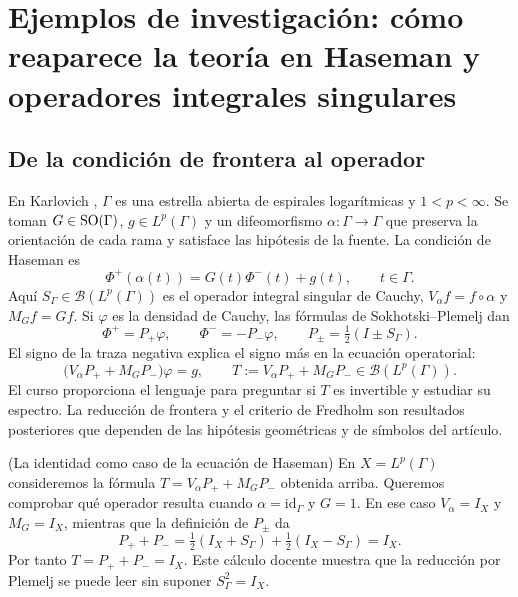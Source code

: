 \chapter{Ejemplos de investigación: cómo reaparece la teoría en Haseman y operadores integrales singulares}

\section{De la condición de frontera al operador}

En Karlovich \cite[pp.~463--464, ecs.~(1.1)--(1.2)]{Karlovich2017}, $\Gamma$ es una
estrella abierta de espirales logarítmicas y $1<p<\infty$.
Se toman $G\in\operatorname{SO}(\Gamma)$, $g\in L^p(\Gamma)$ y un difeomorfismo
$\alpha:\Gamma\to\Gamma$ que preserva la orientación de cada rama y
satisface las hipótesis de la fuente. La condición de Haseman es
\[
 \Phi^+(\alpha(t))=G(t)\Phi^-(t)+g(t),\qquad t\in\Gamma.
\]
Aquí $S_\Gamma\in\mathcal B(L^p(\Gamma))$ es el operador integral singular de Cauchy,
$V_\alpha f=f\circ\alpha$ y $M_Gf=Gf$. Si $\varphi$ es la densidad de Cauchy, las
fórmulas de Sokhotski--Plemelj dan
\[
 \Phi^+=P_+\varphi,\qquad \Phi^-=-P_-\varphi,\qquad
 P_\pm=\tfrac12(I\pm S_\Gamma).
\]
El signo de la traza negativa explica el signo más en la ecuación operatorial:
\[
 \bigl(V_\alpha P_++M_GP_-\bigr)\varphi=g,\qquad
 T:=V_\alpha P_++M_GP_-\in\mathcal B(L^p(\Gamma)).
\]
El curso proporciona el lenguaje para preguntar si $T$ es invertible y estudiar su
espectro. La reducción de frontera y el criterio de Fredholm son resultados posteriores
que dependen de las hipótesis geométricas y de símbolos del artículo.

\begin{cthejemplo}{(La identidad como caso de la ecuación de Haseman)}
En $X=L^p(\Gamma)$ consideremos la fórmula $T=V_\alpha P_++M_GP_-$
obtenida arriba. Queremos comprobar qué operador resulta cuando
$\alpha=\mathrm{id}_\Gamma$ y $G=1$. En ese caso $V_\alpha=I_X$ y
$M_G=I_X$, mientras que la definición de $P_\pm$ da
\[
 P_++P_- =\tfrac12(I_X+S_\Gamma)+\tfrac12(I_X-S_\Gamma)=I_X.
\]
Por tanto $T=P_++P_-=I_X$. Este cálculo docente muestra que la
reducción por Plemelj se puede leer sin suponer $S_\Gamma^2=I_X$.
\end{cthejemplo}

\begin{center}
\end{center}

